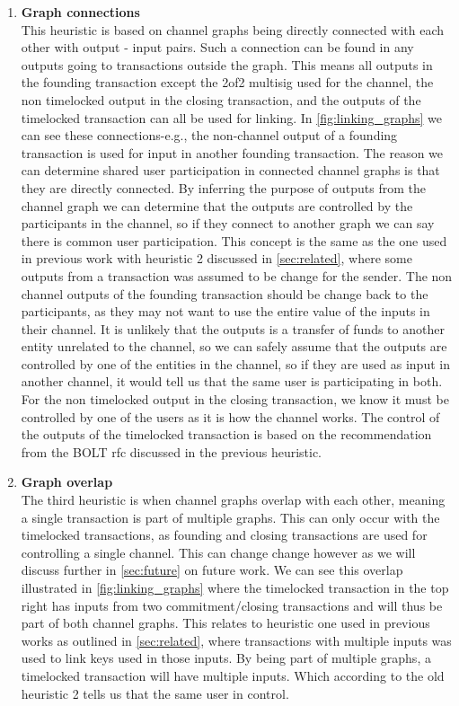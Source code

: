 \begin{enumerate}
    \item \textbf{Graph connections}\\
This heuristic is based on channel graphs being directly connected with each other with output - input pairs. Such a connection can be found in any outputs going to transactions outside the graph. 
This means all outputs in the founding transaction except the 2of2 multisig used for the channel, the non timelocked output in the closing transaction, and the outputs of the timelocked transaction can all be used for linking. 
In \cref{fig:linking_graphs} we can see these connections-e.g., the non-channel output of a founding transaction is used for input in another founding transaction. The reason we can determine shared user participation in connected channel graphs is that they are directly connected.
By inferring the purpose of outputs from the channel graph we can determine that the outputs are controlled by the participants in the channel, so if they connect to another graph we can say there is common user participation.
This concept is the same as the one used in previous work with heuristic 2 discussed in \cref{sec:related}, where some outputs from a transaction was assumed to be change for the sender. The non channel outputs of the founding transaction should be change back to the participants, as they may not want to use the entire value of the inputs in their channel. It is unlikely that the outputs is a transfer of funds to another entity unrelated to the channel, so we can safely assume that the outputs are controlled by one of the entities in the channel, so if they are used as input in another channel, it would tell us that the same user is participating in both. For the non timelocked output in the closing transaction, we know it must be controlled by one of the users as it is how the channel works. The control of the outputs of the timelocked transaction is based on the recommendation from the BOLT rfc \cite{bolt7} discussed in the previous heuristic. 

    \item \textbf{Graph overlap}\\
The third heuristic is when channel graphs overlap with each other, meaning a single transaction is part of multiple graphs. This can only occur with the timelocked transactions, as founding and closing transactions are used for controlling a single channel. This can change change however as we will discuss further in \cref{sec:future} on future work. We can see this overlap illustrated in \cref{fig:linking_graphs} where the timelocked transaction in the top right has inputs from two commitment/closing transactions and will thus be part of both channel graphs. This relates to heuristic one used in previous works as outlined in \cref{sec:related}, where transactions with multiple inputs was used to link keys used in those inputs. By being part of multiple graphs, a timelocked transaction will have multiple inputs. Which according to the old heuristic 2 tells us that the same user in control.
    
    
\end{enumerate}

